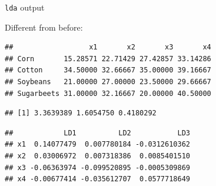 \begin{frame}[fragile]{\texttt{lda} output}
  
  
Different from before:

\begin{knitrout}\footnotesize
{}\color{fgcolor}\begin{kframe}
\begin{alltt}
\hlopt{$}
\end{alltt}
\begin{verbatim}
##                  x1       x2       x3       x4
## Corn       15.28571 22.71429 27.42857 33.14286
## Cotton     34.50000 32.66667 35.00000 39.16667
## Soybeans   21.00000 27.00000 23.50000 29.66667
## Sugarbeets 31.00000 32.16667 20.00000 40.50000
\end{verbatim}
\begin{alltt}
\hlopt{$}
\end{alltt}
\begin{verbatim}
## [1] 3.3639389 1.6054750 0.4180292
\end{verbatim}
\begin{alltt}
\hlopt{$}
\end{alltt}
\begin{verbatim}
##            LD1          LD2           LD3
## x1  0.14077479  0.007780184 -0.0312610362
## x2  0.03006972  0.007318386  0.0085401510
## x3 -0.06363974 -0.099520895 -0.0005309869
## x4 -0.00677414 -0.035612707  0.0577718649
\end{verbatim}
\end{kframe}
\end{knitrout}
  
\end{frame}

